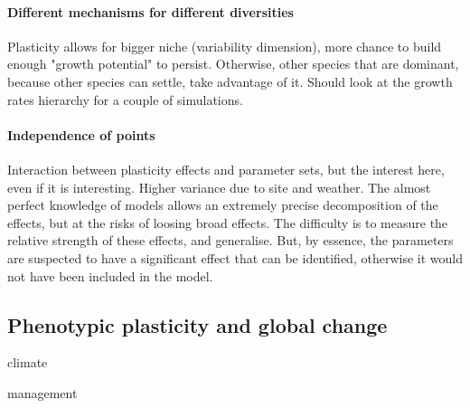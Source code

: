 \paragraph{Different mechanisms for different diversities}


Plasticity allows for bigger niche (variability dimension), more chance to build enough "growth potential" to persist. Otherwise, other species that are dominant, because other species can settle, take advantage of it.
Should look at the growth rates hierarchy for a couple of simulations.






\paragraph{Independence of points}

Interaction between plasticity effects and parameter sets, but the interest here, even if  it is interesting. Higher variance due to site and weather. The almost perfect knowledge of models allows an extremely precise decomposition of the effects, but at the risks of loosing broad effects. The difficulty is to measure the relative strength of these effects, and generalise. But, by essence, the parameters are suspected to have a significant effect that can be identified, otherwise it would not have been included in the model.

\subsection{Phenotypic plasticity and global change}

climate 

management